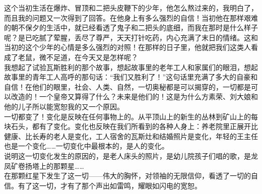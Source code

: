 这个当初生活在爆炸、冒顶和二把头皮鞭下的少年，他怎么熬过来的，我明白了，而且我的问题又一次得到了回答。在他身上有多么强烈的自信！当初他在那样艰难的朝不保夕的生活中，就已经看透了鬼子和二把头的底细，而我在那时是什么样子呢？是已吃腻了荤腥，丢尽了尊严，天天打针吃药，内心充满了末日的情绪。这和当初的这个少年的心情是多么强烈的对照！在那样的日子里，他就把我们这类人看成了老鼠，微不足道，在今天又是怎样呢？\\

我想起了试验瓦斯胜利的那个故事，想起故事里的老年工人和家属们的眼泪，想起故事里的青年工人高呼的那句话：“我们又胜利了！”这句话里充满了多大的自豪和自信！在他们的眼里，社会、人类、自然，一切奥秘都是可以揭穿的，一切都是可以改造的！一个皇帝又算得了什么？未来是他们的！这是为什么方素荣、刘大娘和他的儿子所以能宽恕我的又一个原因。\\

一切都变了！变化是反映在任何事物上的。从平顶山上的新生的丛林到矿山上的每块石头，都有了变化。变化也反映在我们所看到的各种人身上：养老院里正展开比健康、比长寿的老人是变化，工人宿舍的瓦斯灶和结婚照片是变化，年轻的王主任也是一个变化……一切变化中最根本的，是人的变化。\\

说明这一切变化发生的原因的，是老人床头的照片，是幼儿院孩子们唱的歌，是龙凤矿卷扬塔上的那颗星……\\

在那颗红星下发生了这一切——伟大的胸怀，对领袖的无限信仰，看透了一切的自信。有了这一切，才有了那个声出如雷鸣，耀眼如闪电的宽恕。